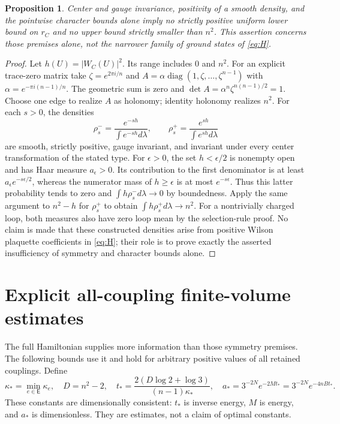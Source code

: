 \documentclass[11pt]{article}
\newtheorem{proposition}[theorem]{Proposition}
\theoremstyle{definition}
\begin{document}
\begin{proposition}\label{prop:symmetryinsufficient}
Center and gauge invariance, positivity of a smooth density, and the
pointwise character bounds alone imply no strictly positive uniform
lower bound on $r_C$ and no upper bound strictly smaller than $n^2$.
This assertion concerns those premises alone, not the narrower family
of ground states of \eqref{eq:H}.
\end{proposition}
\begin{proof}
Let $h(U)=|W_C(U)|^2$. Its range includes $0$ and $n^2$.
For an explicit trace-zero matrix take
$\zeta=e^{2\pi i/n}$ and
$A=\alpha\operatorname{diag}(1,\zeta,\ldots,\zeta^{n-1})$ with
$\alpha=e^{-\pi i(n-1)/n}$. The geometric sum is zero and
$\det A=\alpha^n\zeta^{n(n-1)/2}=1$. Choose one edge to realize $A$
as holonomy; identity holonomy realizes $n^2$.
For each $s>0$, the densities
\[
 \rho_s^- =\frac{e^{-sh}}{\int e^{-sh}d\lambda},\qquad
 \rho_s^+ =\frac{e^{sh}}{\int e^{sh}d\lambda}
\]
are smooth, strictly positive, gauge invariant, and invariant under
every center transformation of the stated type. For $\epsilon>0$, the
set $h<\epsilon/2$ is nonempty open and has Haar measure $a_\epsilon>0$.
Its contribution to the first denominator is at least
$a_\epsilon e^{-s\epsilon/2}$, whereas the numerator mass of $h\geq\epsilon$
is at most $e^{-s\epsilon}$. Thus this latter probability tends to zero
and $\int h\rho_s^-d\lambda\to0$ by boundedness. Apply the same argument
to $n^2-h$ for $\rho_s^+$ to obtain $\int h\rho_s^+d\lambda\to n^2$.
For a nontrivially charged loop, both measures also have zero loop mean
by the selection-rule proof. No claim is made that these constructed
densities arise from positive Wilson plaquette coefficients in
\eqref{eq:H}; their role is to prove exactly the asserted insufficiency
of symmetry and character bounds alone.
\end{proof}

\section{Explicit all-coupling finite-volume estimates}\label{sec:heat}

The full Hamiltonian supplies more information than those symmetry
premises. The following bounds use it and hold for arbitrary positive
values of all retained couplings. Define
\begin{equation}\label{eq:constants}
 \kappa_* =\min_{e\in\mathsf E}\kappa_e,
 \quad D=n^2-2,
 \quad t_* =\frac{2(D\log2+\log3)}{(n-1)\kappa_*},
 \quad a_* =3^{-2N}e^{-2Mt_*}=3^{-2N}e^{-4nBt_*}.
\end{equation}
These constants are dimensionally consistent: $t_*$ is inverse energy,
$M$ is energy, and $a_*$ is dimensionless. They are estimates, not a
claim of optimal constants.
\end{document}
